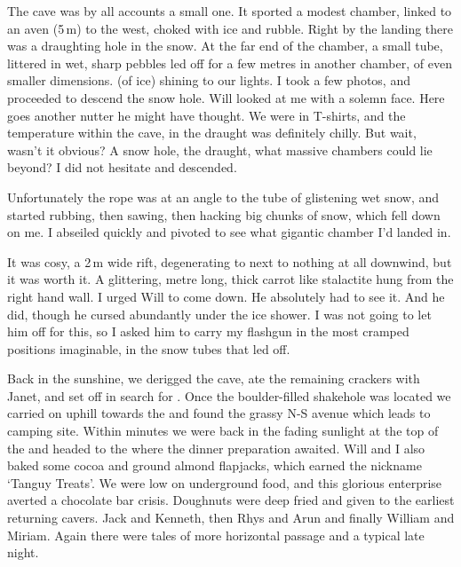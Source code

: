 The cave was by all accounts a small one. It sported a modest chamber, linked to an aven (5\,m) to the west, choked with ice and rubble. Right by the landing there was a draughting hole in the snow. At the far end of the chamber, a small tube, littered in wet, sharp pebbles led off for  a few metres in another chamber, of even smaller dimensions.  (of ice) shining to our lights. I took a few photos, and proceeded to descend the snow hole. Will looked at me with a solemn face. Here goes another nutter he might have thought. We were in T-shirts, and the temperature within the cave, in the draught was definitely chilly. But wait, wasn't it obvious? A snow hole, the draught, what massive chambers could lie beyond? I did not hesitate and descended.

Unfortunately the rope was at an angle to the tube of glistening wet snow, and started rubbing, then sawing, then hacking big chunks of snow, which fell down on me. I abseiled quickly and pivoted to see what gigantic chamber I'd landed in. 

It was cosy, a 2\,m wide rift, degenerating to next to nothing at all downwind, but it was worth it. A glittering, metre long, thick carrot like stalactite hung from the right hand wall. I urged Will to come down. He absolutely had to see it. And he did, though he cursed abundantly under the ice shower. I was not going to let him off for this, so I asked him to carry my flashgun in the most cramped positions imaginable, in the snow tubes that led off. 




Back in the sunshine, we derigged the cave, ate the remaining crackers with Janet, and set off in search for . Once the boulder-filled shakehole was located we carried on uphill towards the  and found the grassy N-S avenue which leads to camping site. Within minutes we were back in the fading sunlight at the top of the  and headed to the  where the dinner preparation awaited. Will and I also baked some cocoa and ground almond flapjacks, which earned the nickname `Tanguy Treats'. We were low on underground food, and this glorious enterprise averted a chocolate bar crisis. Doughnuts were deep fried and given to the earliest returning cavers. Jack and Kenneth, then Rhys and Arun and finally William and Miriam. Again there were tales of more horizontal passage and a typical late  night. 




